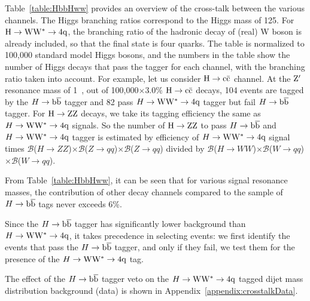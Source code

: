
Table~\ref{table:HbbHww} provides an overview of the cross-talk
between the various channels.  The Higgs branching ratios correspond
to the Higgs mass of 125\GeVcc. 
 For ${\rm H \to WW^* \to 4q }$,
the branching ratio of the hadronic decay of (real) W boson is already 
included, so that the final state is four quarks.
%
The table is normalized to 100,000 standard model Higgs
bosons, and the numbers in the
table show the number of Higgs decays that pass the tagger for each
channel, with the branching ratio taken into account.  For example, 
let us consider ${\rm H \to c\bar{c}}$ channel.  At the ${\rm Z'}$ resonance
mass of 1~\TeVcc, out of 100,000$\times$3.0\% ${\rm H \to c\bar{c}}$ decays,  104 events 
are tagged by the $H\to\mathrm{b\overline{b}}$ tagger  
and  82  pass $H\to{\rm W}{\rm W}^*\to4{\rm q}$ tagger but fail $H\to\mathrm{b\overline{b}}$ tagger.
For ${\rm H \to ZZ}$ decays, we take its tagging efficiency the same 
as $H\to{\rm W}{\rm W}^*\to4{\rm q}$ signals. So the number of ${\rm H \to ZZ}$ to pass $H\to\mathrm{b\overline{b}}$ and 
$H\to{\rm W}{\rm W}^*\to4{\rm q}$ tagger is estimated by 
efficiency of $H\to{\rm W}{\rm W}^*\to4{\rm q}$ signal times 
 $\mathcal{B}$($H \to ZZ$)$\times \mathcal{B}$($Z \to qq$)$\times\mathcal{B}$($Z\to qq$) divided by 
 $\mathcal{B}$($H \to WW$)$\times\mathcal{B}$($W \to qq$)$\times\mathcal{B}$($W\to qq$). 

From Table~\ref{table:HbbHww}, it can be seen that for various signal 
resonance masses, the contribution of other decay channels compared to the 
sample of $H\to\mathrm{b\overline{b}}$ tags never exceeds 6\%. 



Since the $H\to\mathrm{b\overline{b}}$ tagger has significantly lower background than $H\to{\rm W}{\rm W}^*\to4{\rm q}$,
it takes precedence in selecting events: we first identify the
events that pass the $H\to\mathrm{b\overline{b}}$ tagger, and only if they fail,  we
test them for the presence of the $H\to{\rm W}{\rm W}^*\to4{\rm q}$ tag.  



The effect of the $H\to\mathrm{b\overline{b}}$ tagger veto on the $H\to{\rm W}{\rm W}^*\to4{\rm q}$ tagged dijet 
mass distribution
background (data) is shown in Appendix~\ref{appendix:crosstalkData}.


